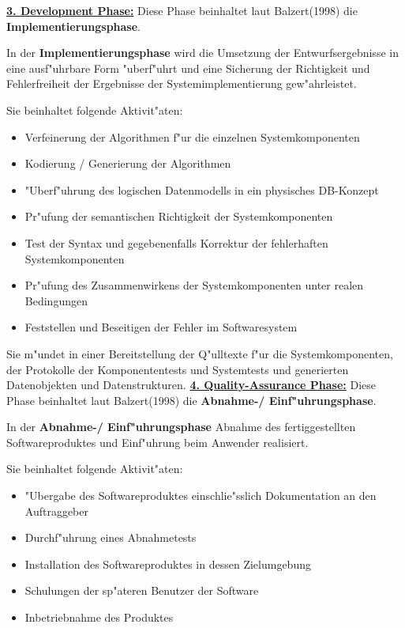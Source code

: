 \bigbreak
\underline{\textbf{3. Development Phase:}}
\smallbreak
Diese Phase beinhaltet laut Balzert(1998)\supercite{Balzert1998} die \textbf{Implementierungsphase}.

In der \textbf{Implementierungsphase} wird die Umsetzung der Entwurfsergebnisse in eine ausf"uhrbare Form "uberf"uhrt und eine Sicherung der Richtigkeit und Fehlerfreiheit der Ergebnisse der Systemimplementierung gew"ahrleistet.

Sie beinhaltet folgende Aktivit"aten:
\begin{itemize}
  \item Verfeinerung der Algorithmen f"ur die einzelnen Systemkomponenten
  \item Kodierung / Generierung der Algorithmen
  \item "Uberf"uhrung des logischen Datenmodells in ein physisches DB-Konzept
  \item Pr"ufung der semantischen Richtigkeit der Systemkomponenten
  \item Test der Syntax und gegebenenfalls Korrektur der fehlerhaften Systemkomponenten
  \item Pr"ufung des Zusammenwirkens der Systemkomponenten unter realen Bedingungen
  \item Feststellen und Beseitigen der Fehler im Softwaresystem
\end{itemize}
Sie m"undet in einer Bereitstellung der Q"ulltexte f"ur die Systemkomponenten, der Protokolle der Komponententests und Systemtests und generierten Datenobjekten und Datenstrukturen.
\bigbreak
\underline{\textbf{4. Quality-Assurance Phase:}}
\smallbreak
Diese Phase beinhaltet laut Balzert(1998)\supercite{Balzert1998} die \textbf{Abnahme-/ Einf"uhrungsphase}.

In der \textbf{Abnahme-/ Einf"uhrungsphase} Abnahme des fertiggestellten Softwareproduktes und Einf"uhrung beim Anwender realisiert.

Sie beinhaltet folgende Aktivit"aten:

\begin{itemize}
  \item "Ubergabe des Softwareproduktes einschlie"sslich Dokumentation an den Auftraggeber
  \item Durchf"uhrung eines Abnahmetests
  \item Installation des Softwareproduktes in dessen Zielumgebung
  \item Schulungen der sp"ateren Benutzer der Software
  \item Inbetriebnahme des Produktes
\end{itemize}

